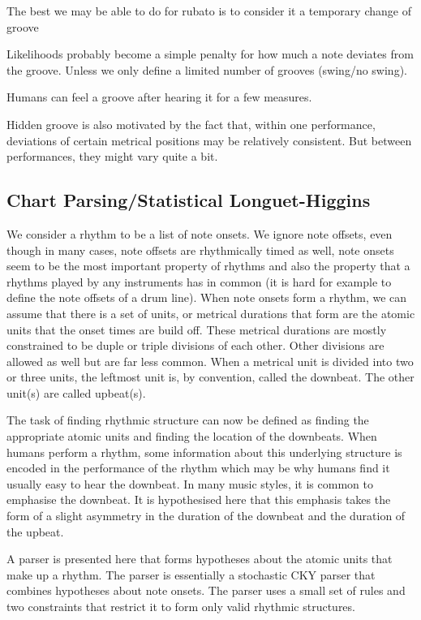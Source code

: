 \documentclass[a4paper,10pt]{article}
\begin{document}
The best we may be able to do for rubato is to consider it a temporary change of groove

Likelihoods probably become a simple penalty for how much a note deviates from the groove. Unless we only define a limited number of grooves (swing/no swing).

Humans can feel a groove after hearing it for a few measures.

Hidden groove is also motivated by the fact that, within one performance, deviations of certain metrical positions may be relatively consistent. But between performances, they might vary quite a bit.
\subsection{Chart Parsing/Statistical Longuet-Higgins}

\label{sec:chart}

We consider a rhythm to be a list of note onsets. We ignore note offsets, even though in many cases, note offsets are rhythmically timed as well, note onsets seem to be the most important property of rhythms and also the property that a rhythms played by any instruments has in common (it is hard for example to define the note offsets of a drum line). When note onsets form a rhythm, we can assume that there is a set of units, or metrical durations that form are the atomic units that the onset times are build off. These metrical durations are mostly constrained to be duple or triple divisions of each other. Other divisions are allowed as well but are far less common. When a metrical unit is divided into two or three units, the leftmost unit is, by convention, called the downbeat. The other unit(s) are called upbeat(s).

The task of finding rhythmic structure can now be defined as finding the appropriate atomic units and finding the location of the downbeats. When humans perform a rhythm, some information about this underlying structure is encoded in the performance of the rhythm which may be why humans find it usually easy to hear the downbeat. In many music styles, it is common to emphasise the downbeat. It is hypothesised here that this emphasis takes the form of a slight asymmetry in the duration of the downbeat and the duration of the upbeat.

A parser is presented here that forms hypotheses about the atomic units that make up a rhythm. The parser is essentially a stochastic CKY parser that combines hypotheses about note onsets. The parser uses a small set of rules and two constraints that restrict it to form only valid rhythmic structures. 
\end{document}
